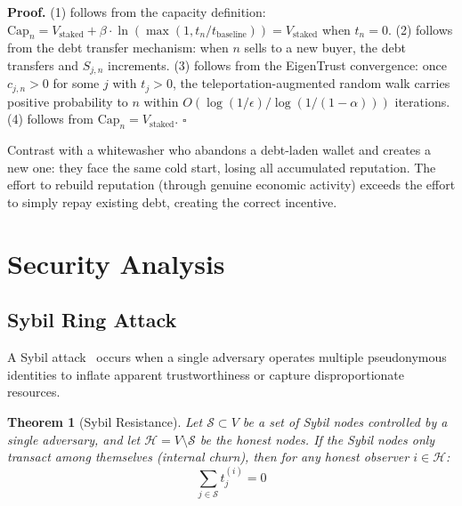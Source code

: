 \documentclass[11pt]{article}
\newtheorem{theorem}{Theorem}[section]
\newcommand{\qed}{\hfill}
\newenvironment{proof}{\noindent\textbf{Proof.}}{\qed$\square$\par\medskip}
\begin{document}
\begin{proof}
(1) follows from the capacity definition: $\text{Cap}_n = V_{\text{staked}} + \beta \cdot \ln(\max(1, t_n / t_{\text{baseline}})) = V_{\text{staked}}$ when $t_n = 0$. (2) follows from the debt transfer mechanism: when $n$ sells to a new buyer, the debt transfers and $S_{j,n}$ increments. (3) follows from the EigenTrust convergence: once $c_{j,n} > 0$ for some $j$ with $t_j > 0$, the teleportation-augmented random walk carries positive probability to $n$ within $O(\log(1/\epsilon) / \log(1/(1-\alpha)))$ iterations. (4) follows from $\text{Cap}_n = V_{\text{staked}}$. \qed
\end{proof}

Contrast with a whitewasher who abandons a debt-laden wallet and creates a new one: they face the same cold start, losing all accumulated reputation. The effort to rebuild reputation (through genuine economic activity) exceeds the effort to simply repay existing debt, creating the correct incentive.

\section{Security Analysis}
\label{sec:security}

\subsection{Sybil Ring Attack}

A Sybil attack~\cite{douceur2002} occurs when a single adversary operates multiple pseudonymous identities to inflate apparent trustworthiness or capture disproportionate resources.

\begin{theorem}[Sybil Resistance]\label{thm:sybil}
Let $\mathcal{S} \subset V$ be a set of Sybil nodes controlled by a single adversary, and let $\mathcal{H} = V \setminus \mathcal{S}$ be the honest nodes. If the Sybil nodes only transact among themselves (internal churn), then for any honest observer $i \in \mathcal{H}$:
\begin{equation}
    \sum_{j \in \mathcal{S}} t^{(i)}_j = 0
\end{equation}
\end{theorem}
\end{document}
